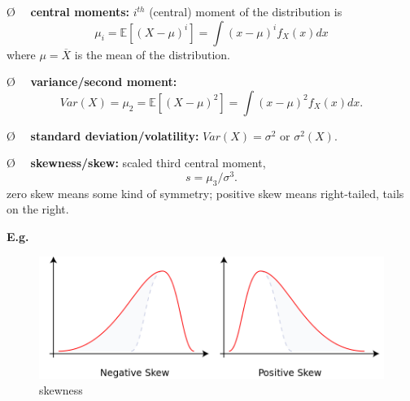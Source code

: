 \documentclass[13pt]{article}
\theoremstyle{definition}
\theoremstyle{remark}
\newenvironment{point}
  {\O~~}
  {}
\begin{document}
  \begin{point}
    \textbf{central moments:} 
    $i^{th}$ (central) moment of the distribution is
$$\mu_i=\mathbb{E}[(X-\mu)^i]=\int{(x-\mu)^i f_X(x)dx}$$
where $\mu=\overline{X}$ is the mean of the distribution.


\end{point}

  \begin{point}
    \textbf{variance/second moment:} \[Var(X)=\mu_2=\mathbb{E}[(X-\mu)^2]=\int{(x-\mu)^2 f_X(x)dx}.\] 
\end{point}

  \begin{point}
    \textbf{standard deviation/volatility:} $Var(X)=\sigma^2$ or $\sigma^2(X)$.

\end{point}

  \begin{point}
    \textbf{skewness/skew:} scaled third central moment, \[s=\mu_3/\sigma^3.\] zero skew means some kind of symmetry; positive skew means right-tailed, tails on the right.
    
    \textbf{E.g.} \begin{figure}[!htp]
        \centering
\includegraphics[width=0.6\linewidth,height =0.2\linewidth, angle=0]{skew.png}
        \caption{skewness}
        \label{fig:skewness}
    \end{figure} 
\end{point}
\end{document}
